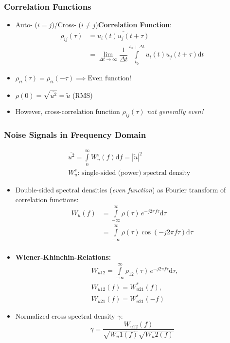 \subsubsection{Correlation Functions}
\begin{itemize}
    \itemsep0pt
    \item Auto- ($i=j$)/Cross- ($i\neq j$)\textbf{Correlation Function}:
    \begin{align*}
        \rho_{ij}(\tau) &= \overline{u_i(t) u_j(t+\tau)}\\
        &= \lim_{\Delta t\to\infty} \dfrac{1}{\Delta t} \int\limits^{t_0+\Delta t}_{t_0} u_i(t) u_j(t+\tau) \mathrm{d}t
    \end{align*}
    \item $\rho_{ii}(\tau) = \rho_{ii}(-\tau) \implies \text{Even function!}$
    \item $\rho(0) = \sqrt{\overline{u^2}} = \tilde{u}$ (RMS)
    \item However, cross-correlation function $\rho_{ij}(\tau)$ \textit{not generally even!}
\end{itemize}

\subsubsection{Noise Signals in Frequency Domain}
\begin{align*}
    &\overline{u^2} = \int\limits_0^\infty W_u^s(f) \mathrm{d}f = |\tilde{u}|^2\\
    &W_u^s\text{: single-sided (power) spectral density}
\end{align*}
\begin{itemize}
    \itemsep0pt
    \item Double-sided spectral densities (\textit{even function}) as Fourier transform of correlation functions:
        \begin{align*}
            W_u(f) &= \int\limits^\infty_{-\infty}\rho(\tau)\,e^{-j2\pi f\tau}\mathrm{d}\tau\\
            &= \int\limits^\infty_{-\infty}\rho(\tau) \cos(-j2\pi f\tau)\mathrm{d}\tau\\
        \end{align*}
    \item \textbf{Wiener-Khinchin-Relations:}
    \begin{align*}
        &W_{u12} = \int\limits^\infty_{-\infty}\rho_{12}(\tau)\,e^{-j2\pi f\tau}\mathrm{d}\tau,\\
        &W_{u12}(f) = W_{u21}^*(f),\\
        &W_{u21}(f) = W_{u21}^*(-f)
    \end{align*}
    \item Normalized cross spectral density $\gamma$:
        \begin{equation*}
            \gamma = \dfrac{W_{u12}(f)}{\sqrt{W_u1(f)} \sqrt{W_u2(f)}}
        \end{equation*}
\end{itemize}


